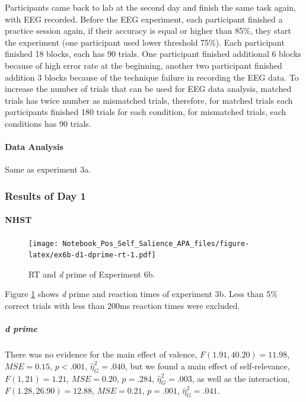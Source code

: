 \documentclass[
  english,
  man]{apa6}
\let\oldparagraph\paragraph
\renewcommand{\paragraph}[1]{\oldparagraph{#1}\mbox{}}
\let\oldsubparagraph\subparagraph
\renewcommand{\subparagraph}[1]{\oldsubparagraph{#1}\mbox{}}
\begin{document}
Participants came back to lab at the second day and finish the same task again, with EEG recorded. Before the EEG experiment, each participant finished a practice session again, if their accuracy is equal or higher than 85\%, they start the experiment (one participant used lower threshold 75\%). Each participant finished 18 blocks, each has 90 trials. One participant finished additional 6 blocks because of high error rate at the beginning, another two participant finished addition 3 blocks because of the technique failure in recording the EEG data. To increase the number of trials that can be used for EEG data analysis, matched trials has twice number as mismatched trials, therefore, for matched trials each participants finished 180 trials for each condition, for mismatched trials, each conditions has 90 trials.

\hypertarget{data-analysis-8}{%
\paragraph{Data Analysis}\label{data-analysis-8}}

Same as experiment 3a.

\hypertarget{results-of-day-1}{%
\subsubsection{Results of Day 1}\label{results-of-day-1}}

\hypertarget{nhst-5}{%
\paragraph{NHST}\label{nhst-5}}

\begin{figure}
\centering
\texttt{[image: Notebook\_Pos\_Self\_Salience\_APA\_files/figure-latex/ex6b-d1-dprime-rt-1.pdf]}
\caption{\label{fig:ex6b-d1-dprime-rt}RT and \emph{d} prime of Experiment 6b.}
\end{figure}

Figure \ref{fig:ex6b-d1-dprime-rt} shows \emph{d} prime and reaction times of experiment 3b. Less than 5\% correct trials with less than 200ms reaction times were excluded.

\hypertarget{d-prime-5}{%
\subparagraph{d prime}\label{d-prime-5}}

There was no evidence for the main effect of valence, \(F(1.91, 40.20) = 11.98\), \(\mathit{MSE} = 0.15\), \(p < .001\), \(\hat{\eta}^2_G = .040\), but we found a main effect of self-relevance, \(F(1, 21) = 1.21\), \(\mathit{MSE} = 0.20\), \(p = .284\), \(\hat{\eta}^2_G = .003\), as well as the interaction, \(F(1.28, 26.90) = 12.88\), \(\mathit{MSE} = 0.21\), \(p = .001\), \(\hat{\eta}^2_G = .041\).
\end{document}

